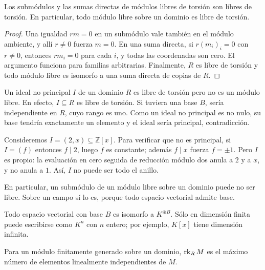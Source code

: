 \begin{lema}\label{lema:C20-libre-torsion}
Los submódulos y las sumas directas de módulos libres de torsión son libres de torsión. En particular, todo módulo libre sobre un dominio es libre de torsión.
\end{lema}
\begin{proof}
Una igualdad $rm=0$ en un submódulo vale también en el módulo ambiente, y allí $r\ne0$ fuerza $m=0$. En una suma directa, si $r(m_i)_i=0$ con $r\ne0$, entonces $rm_i=0$ para cada $i$, y todas las coordenadas son cero. El argumento funciona para familias arbitrarias. Finalmente, $R$ es libre de torsión y todo módulo libre es isomorfo a una suma directa de copias de $R$.
\end{proof}

\begin{ejem}\label{ejem:C20-ideal-no-libre}
Un ideal no principal $I$ de un dominio $R$ es libre de torsión pero no es un módulo libre. En efecto, $I\subseteq R$ es libre de torsión. Si tuviera una base $B$, sería independiente en $R$, cuyo rango es uno. Como un ideal no principal es no nulo, su base tendría exactamente un elemento y el ideal sería principal, contradicción.

Consideremos $I=(2,x)\subseteq\mathbb Z[x]$. Para verificar que no es principal, si $I=(f)$ entonces $f\mid2$, luego $f$ es constante; además $f\mid x$ fuerza $f=\pm1$. Pero $I$ es propio: la evaluación en cero seguida de reducción módulo dos anula a $2$ y a $x$, y no anula a $1$. Así, $I$ no puede ser todo el anillo.
\end{ejem}
En particular, un submódulo de un módulo libre sobre un dominio puede no ser libre. Sobre un campo sí lo es, porque todo espacio vectorial admite base.

\begin{obs}
Todo espacio vectorial con base $B$ es isomorfo a $K^{\oplus B}$. Sólo en dimensión finita puede escribirse como $K^n$ con $n$ entero; por ejemplo, $K[x]$ tiene dimensión infinita.
\end{obs}

\begin{defi}
Para un módulo finitamente generado sobre un dominio, $\operatorname{rk}_R M$ es el máximo número de elementos linealmente independientes de $M$.
\end{defi}


